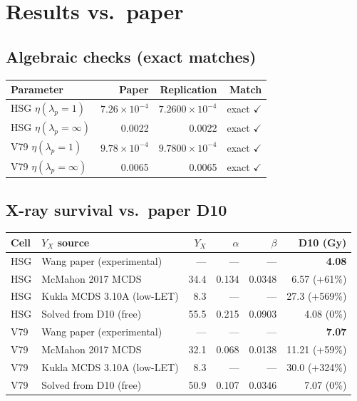 \documentclass[11pt]{article}
\begin{document}
\section{Results vs.\ paper}

\subsection{Algebraic checks (exact matches)}

\begin{tabular}{lrrr}
\toprule
\textbf{Parameter} & \textbf{Paper} & \textbf{Replication} & \textbf{Match} \\
\midrule
HSG $\eta(\lambda_p=1)$ & $7.26\times 10^{-4}$ & $7.2600\times 10^{-4}$ & exact $\checkmark$ \\
HSG $\eta(\lambda_p=\infty)$ & 0.0022 & 0.0022 & exact $\checkmark$ \\
V79 $\eta(\lambda_p=1)$ & $9.78\times 10^{-4}$ & $9.7800\times 10^{-4}$ & exact $\checkmark$ \\
V79 $\eta(\lambda_p=\infty)$ & 0.0065 & 0.0065 & exact $\checkmark$ \\
\bottomrule
\end{tabular}

\subsection{X-ray survival vs.\ paper D10}

\begin{tabular}{llrrrr}
\toprule
\textbf{Cell} & \textbf{$Y_X$ source} & \textbf{$Y_X$} & \textbf{$\alpha$} & \textbf{$\beta$} & \textbf{D10 (Gy)} \\
\midrule
HSG & Wang paper (experimental) & --- & --- & --- & \textbf{4.08} \\
HSG & McMahon 2017 MCDS & 34.4 & 0.134 & 0.0348 & 6.57 (+61\%) \\
HSG & Kukla MCDS 3.10A (low-LET) & 8.3 & --- & --- & 27.3 (+569\%) \\
HSG & Solved from D10 (free) & 55.5 & 0.215 & 0.0903 & 4.08 (0\%) \\
V79 & Wang paper (experimental) & --- & --- & --- & \textbf{7.07} \\
V79 & McMahon 2017 MCDS & 32.1 & 0.068 & 0.0138 & 11.21 (+59\%) \\
V79 & Kukla MCDS 3.10A (low-LET) & 8.3 & --- & --- & 30.0 (+324\%) \\
V79 & Solved from D10 (free) & 50.9 & 0.107 & 0.0346 & 7.07 (0\%) \\
\bottomrule
\end{tabular}
\end{document}

